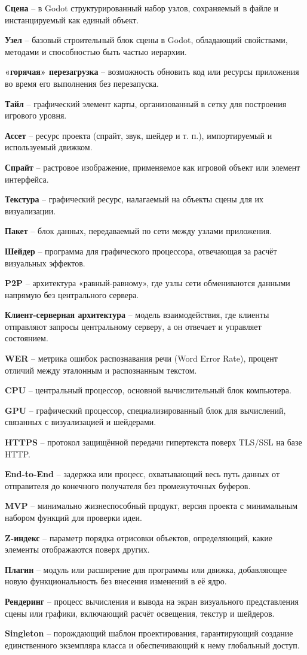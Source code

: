 \textbf{Сцена} -- в Godot структурированный набор узлов, сохраняемый в файле и инстанцируемый как единый объект.

\textbf{Узел} -- базовый строительный блок сцены в Godot, обладающий свойствами, методами и способностью быть частью иерархии.

\textbf{«горячая» перезагрузка} -- возможность обновить код или ресурсы приложения во время его выполнения без перезапуска.

\textbf{Тайл} -- графический элемент карты, организованный в сетку для построения игрового уровня.

\textbf{Ассет} -- ресурс проекта (спрайт, звук, шейдер и т. п.), импортируемый и используемый движком.

\textbf{Спрайт} -- растровое изображение, применяемое как игровой объект или элемент интерфейса.

\textbf{Текстура} -- графический ресурс, налагаемый на объекты сцены для их визуализации.

\textbf{Пакет} -- блок данных, передаваемый по сети между узлами приложения.

\textbf{Шейдер} -- программа для графического процессора, отвечающая за расчёт визуальных эффектов.

\textbf{P2P} -- архитектура «равный-равному», где узлы сети обмениваются данными напрямую без центрального сервера.

\textbf{Клиент-серверная архитектура} -- модель взаимодействия, где клиенты отправляют запросы центральному серверу, а он отвечает и управляет состоянием.

\textbf{WER} -- метрика ошибок распознавания речи (Word Error Rate), процент отличий между эталонным и распознанным текстом.

\textbf{CPU} -- центральный процессор, основной вычислительный блок компьютера.

\textbf{GPU} -- графический процессор, специализированный блок для вычислений, связанных с визуализацией и шейдерами.

\textbf{HTTPS} -- протокол защищённой передачи гипертекста поверх TLS/SSL на базе HTTP.

\textbf{End-to-End} -- задержка или процесс, охватывающий весь путь данных от отправителя до конечного получателя без промежуточных буферов.

\textbf{MVP} -- минимально жизнеспособный продукт, версия проекта с минимальным набором функций для проверки идеи.

\textbf{Z-индекс} -- параметр порядка отрисовки объектов, определяющий, какие элементы отображаются поверх других.

\textbf{Плагин} -- модуль или расширение для программы или движка, добавляющее новую функциональность без внесения изменений в её ядро.

\textbf{Рендеринг} -- процесс вычисления и вывода на экран визуального представления сцены или графики, включающий расчёт освещения, текстур и шейдеров.

\textbf{Singleton} -- порождающий шаблон проектирования, гарантирующий создание единственного экземпляра класса и обеспечивающий к нему глобальный доступ.
